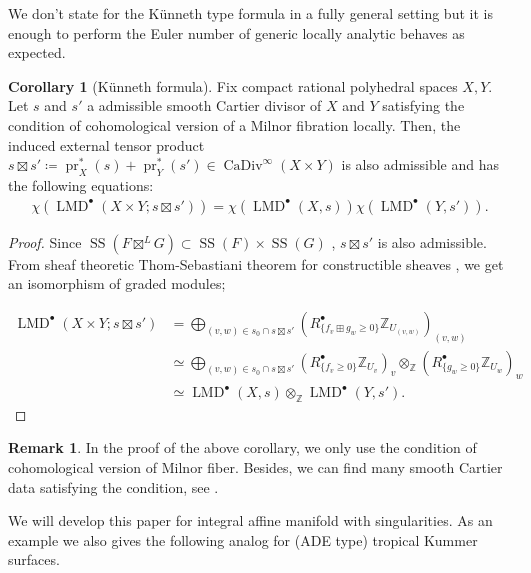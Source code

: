 \documentclass[a4paper,dvipdfmx,reqno,12pt]{amsart}
\theoremstyle{definition}
\newtheorem{corollary}[theorem]{Corollary}
\newtheorem{remark}[theorem]{Remark}
\newcommand{\deq}{\coloneqq}
\newcommand{\Z}{\mathbb{Z}}%
\newcommand{\opn}[1]{\operatorname{#1}}
\numberwithin{equation}{section}
\begin{document}
We don't state for the K\"unneth type formula in a fully
general setting but it is enough to perform the Euler number of
generic locally analytic  behaves as expected.
\begin{corollary}[{K\"unneth formula}]
Fix compact rational polyhedral spaces $X,Y$.
Let $s$ and $s'$ a admissible smooth Cartier divisor of $X$ and $Y$ 
satisfying the condition of cohomological version of a Milnor 
fibration \cite[Assumption 1.1.1]{MR2031639} locally.
Then, the induced external tensor product 
$s\boxtimes s'\deq \opn{pr}_X^{*} (s)+\opn{pr}_Y^{*}(s')
\in \opn{CaDiv}^{\infty}(X\times Y)$ is also admissible and
has the following equations:
\begin{align}
\chi(\opn{LMD}^{\bullet}(X\times Y;s\boxtimes s'))=
\chi(\opn{LMD}^{\bullet}(X,s))\chi(\opn{LMD}^{\bullet}(Y,s')).
\end{align}

\end{corollary}
\begin{proof}
Since 
$\opn{SS}(F\boxtimes^{L} G)\subset \opn{SS}(F)\times \opn{SS}(G)$
\cite[Proposition 5.4.1]{MR1299726},
$s\boxtimes s'$ is also admissible.
From sheaf theoretic Thom-Sebastiani theorem for constructible sheaves 
\cite[Corollary 1.2.1]{MR2031639}, we get an isomorphism of 
graded modules;

\begin{align}
\opn{LMD}^{\bullet}(X\times Y;s\boxtimes s') 
& =\bigoplus_{(v,w)\in s_0\cap s\boxtimes s'}
(R^{\bullet}_{\{f_v\boxplus g_w\geq 0\}}\Z_{U_{(v,w)}})_{(v,w)} \\
& \simeq \bigoplus_{(v,w)\in s_0\cap s\boxtimes s'}
(R^{\bullet}_{\{f_v\geq 0\}}\Z_{U_v})_v
\otimes_{\Z} (R^{\bullet}_{\{g_w\geq 0\}}\Z_{U_w})_w \\
& \simeq
\opn{LMD}^{\bullet}(X,s)\otimes_{\Z} 
\opn{LMD}^{\bullet}(Y,s').
\end{align}

\end{proof}

\begin{remark}
In the proof of the above corollary, we only use
the condition of cohomological version of Milnor fiber. 
Besides, we can find many smooth Cartier data satisfying 
the condition, see \cite[p.35]{MR2031639}.  
\end{remark}

We will develop this paper for integral affine manifold
with singularities. As an example we also gives the 
following analog for (ADE type) tropical Kummer surfaces.
\end{document}

